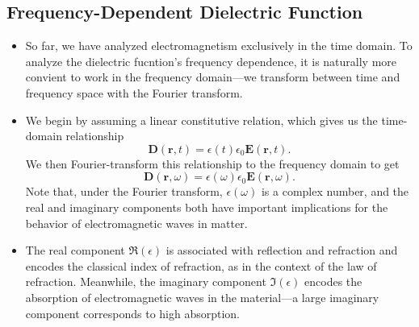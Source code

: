 \documentclass[11pt, a4paper]{article}
\renewcommand{\vec}[1]{\bm{#1}} %
\renewcommand{\r}{\vec{r}}
\newcommand{\E}{\vec{E}} %
\newcommand{\D}{\vec{D}}  %
\begin{document}
\subsection{Frequency-Dependent Dielectric Function}
\begin{itemize}
    \item So far, we have analyzed electromagnetism exclusively in the time domain. To analyze the dielectric fucntion's frequency dependence, it is naturally more convient to work in the frequency domain---we transform between time and frequency space with the Fourier transform. 

    \item We begin by assuming a linear constitutive relation, which gives us the time-domain relationship
    \begin{equation*}
        \D(\r, t) = \epsilon(t)\epsilon_{0} \E(\r, t).
    \end{equation*}
    We then Fourier-transform this relationship to the frequency domain to get
    \begin{equation*}
        \D(\r, \omega) = \epsilon(\omega)\epsilon_{0}\E(\r, \omega).
    \end{equation*}
    Note that, under the Fourier transform, $ \epsilon(\omega) $ is a complex number, and the real and imaginary components both have important implications for the behavior of electromagnetic waves in matter.

    \item The real component $ \Re(\epsilon) $ is associated with reflection and refraction and encodes the classical index of refraction, as in the context of the law of refraction. Meanwhile, the imaginary component $ \Im(\epsilon) $ encodes the absorption of electromagnetic waves in the material---a large imaginary component corresponds to high absorption. 

            
\end{itemize}
\end{document}
